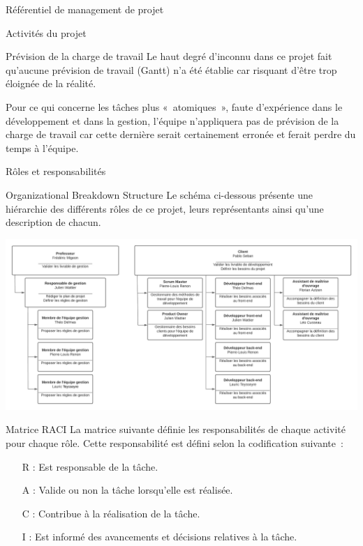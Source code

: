 \documentclass[]{article}
\begin{document}
{\begin{section}{\label{sec:Référentiel de management de projet}Référentiel de management de projet}
\begin{subsection}{\label{sec:Activités du projet}Activités du projet}
         \begin{subsubsection}{\label{sec:Prévision de la charge de travail}Prévision de la charge de travail}
             Le haut degré d’inconnu dans ce projet fait qu’aucune prévision de travail (Gantt) n’a été établie car risquant d’être trop éloignée de la réalité.

             Pour ce qui concerne les tâches plus « atomiques », faute d’expérience dans le développement et dans la gestion, l’équipe n’appliquera pas de prévision de la charge de travail car cette dernière serait certainement erronée et ferait perdre du temps à l’équipe.
         \end{subsubsection}
     \end{subsection}

\newpage

     \begin{subsection}{\label{sec:Rôles et responsabilités}Rôles et responsabilités}
         \begin{subsubsection}{\label{sec:Organizational Breakdown Structure}Organizational Breakdown Structure}
             Le schéma ci-dessous présente une hiérarchie des différents rôles de ce projet, leurs représentants ainsi qu’une description de chacun.

             \includegraphics[scale=0.32]{documents/IMG/OBS}
         \end{subsubsection}

         \begin{subsubsection}{\label{sec:Matrice RACI}Matrice RACI}
             La matrice suivante définie les responsabilités de chaque activité pour chaque rôle. Cette responsabilité est défini selon la codification suivante :
             \begin{itemize}
                 \item[R]: Est responsable de la tâche.
                 \item[A] : Valide ou non la tâche lorsqu’elle est réalisée.
                 \item[C] : Contribue à la réalisation de la tâche.
                 \item[I] : Est informé des avancements et décisions relatives à la tâche.
             \end{itemize}


\end{subsubsection}
\end{subsection}
\end{section}}
\end{document}
